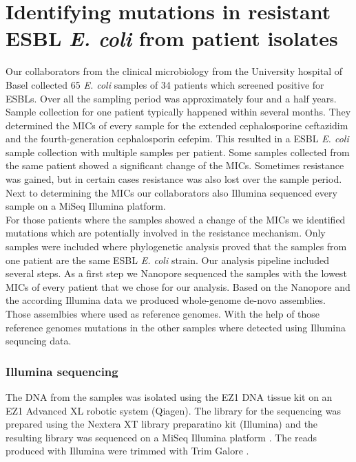 \section{Identifying mutations in resistant ESBL \textit{E. coli} from patient isolates}
Our collaborators from the clinical microbiology from the University hospital of Basel collected 65 \textit{E. coli} samples of 34 patients which screened positive for ESBLs. Over all the sampling period was approximately four and a half years. Sample collection for one patient typically happened within several months. They determined the MICs of every sample for the extended cephalosporine ceftazidim and the fourth-generation cephalosporin cefepim. This resulted in a ESBL \textit{E. coli} sample collection with multiple samples per patient. Some samples collected from the same patient showed a significant change of the MICs. Sometimes resistance was gained, but in certain cases resistance was also lost over the sample period. Next to determining the MICs our collaborators also Illumina sequenced every sample on a MiSeq Illumina platform.\\
For those patients where the samples showed a change of the MICs we identified mutations which are potentially involved in the resistance mechanism. Only samples were included where phylogenetic analysis proved that the samples from one patient are the same ESBL \textit{E. coli} strain. Our analysis pipeline included several steps. As a first step we Nanopore sequenced the samples with the lowest MICs of every patient that we chose for our analysis. Based on the Nanopore and the according Illumina data we produced whole-genome de-novo assemblies. Those assemlbies where used as reference genomes. With the help of those reference genomes mutations in the other samples where detected using Illumina sequncing data.  

\subsubsection{Illumina sequencing}
The DNA from the samples was isolated using the EZ1 DNA tissue kit on an EZ1 Advanced XL robotic system (Qiagen). The library for the sequencing was prepared using the Nextera XT library preparatino kit (Illumina) and the resulting library was sequenced on a MiSeq Illumina platform \cite{nanopore}. The reads produced with Illumina were trimmed with Trim Galore \cite{noauthor_babraham_nodate}.

